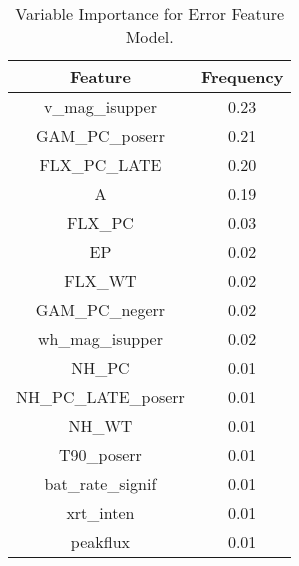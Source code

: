 \begin{table}[H]
\begin{center}
\begin{tabular}{cc}
  \hline
Feature & Frequency \\ 
  \hline
v\_mag\_isupper & 0.23 \\ 
  GAM\_PC\_poserr & 0.21 \\ 
  FLX\_PC\_LATE & 0.20 \\ 
  A & 0.19 \\ 
  FLX\_PC & 0.03 \\ 
  EP & 0.02 \\ 
  FLX\_WT & 0.02 \\ 
  GAM\_PC\_negerr & 0.02 \\ 
  wh\_mag\_isupper & 0.02 \\ 
  NH\_PC & 0.01 \\ 
  NH\_PC\_LATE\_poserr & 0.01 \\ 
  NH\_WT & 0.01 \\ 
  T90\_poserr & 0.01 \\ 
  bat\_rate\_signif & 0.01 \\ 
  xrt\_inten & 0.01 \\ 
  peakflux & 0.01 \\ 
   \hline
\end{tabular}
\caption{Variable Importance for Error Feature Model.}
\label{tab:errorVarImp}
\end{center}
\end{table}
